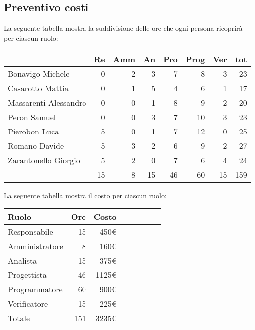 \subsection{Preventivo costi}

La seguente tabella mostra la suddivisione delle ore che ogni persona ricoprirà per ciascun ruolo:

\begin{table}[ht]
    \begin{tabularx}{\linewidth}{X|rrrrrrr}
    \rowcolor{gray!30}& Re & Amm & An & Pro & Prog & Ver & tot \\
    \hline
    Bonavigo Michele                        & 0 & 2 & 3 & 7 & 8 & 3 & 23 \\
    \rowcolor{gray!10}Casarotto Mattia      & 0 & 1 & 5 & 4 & 6 & 1 & 17 \\
    Massarenti Alessandro                   & 0 & 0 & 1 & 8 & 9 & 2 & 20 \\
    \rowcolor{gray!10}Peron Samuel          & 0 & 0 & 3 & 7 & 10 & 3 & 23 \\
    Pierobon Luca                           & 5 & 0 & 1 & 7 & 12 & 0 & 25 \\
    \rowcolor{gray!10}Romano Davide         & 5 & 3 & 2 & 6 & 9 & 2 & 27 \\
    Zarantonello Giorgio                    & 5 & 2 & 0 & 7 & 6 & 4 & 24 \\
    \hline                                  & 15 & 8 & 15 & 46 & 60 & 15 & 159 \\ 
    \end{tabularx}
\end{table}

La seguente tabella mostra il costo per ciascun ruolo:
\begin{table}[ht]
    \begin{tabularx}{\linewidth}{X|rrrrrrr}
    \rowcolor{gray!30}Ruolo & Ore & Costo \\
    \hline
    Responsabile                            & 15  & 450€ \\
    \rowcolor{gray!10}Amministratore        & 8 & 160€ \\
    Analista                                & 15  & 375€ \\
    \rowcolor{gray!10}Progettista           & 46  & 1125€ \\
    Programmatore                           & 60 & 900€ \\
    \rowcolor{gray!10}Verificatore          & 15  & 225€ \\
    \hline Totale                           & 151  & 3235€ \\ 
    \end{tabularx}
\end{table}


